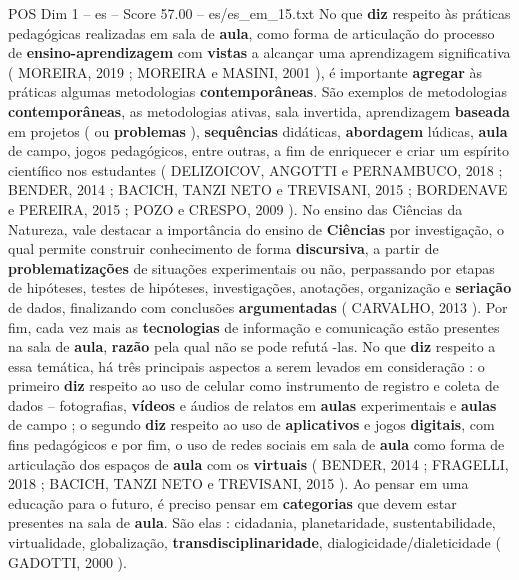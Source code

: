 \begin{textsample}{POS Dim 1 – es – Score 57.00 – es/es\_em\_15.txt}
No que \textbf{diz} respeito às práticas pedagógicas realizadas em sala de \textbf{aula}, como forma de articulação do processo de \textbf{ensino-aprendizagem} com \textbf{vistas} a alcançar uma aprendizagem significativa ( MOREIRA, 2019 ; MOREIRA e MASINI, 2001 ), é importante \textbf{agregar} às práticas algumas metodologias \textbf{contemporâneas}.
São exemplos de metodologias \textbf{contemporâneas}, as metodologias ativas, sala invertida, aprendizagem \textbf{baseada} em projetos ( ou \textbf{problemas} ), \textbf{sequências} didáticas, \textbf{abordagem} lúdicas, \textbf{aula} de campo, jogos pedagógicos, entre outras, a fim de enriquecer e criar um espírito científico nos estudantes ( DELIZOICOV, ANGOTTI e PERNAMBUCO, 2018 ; BENDER, 2014 ; BACICH, TANZI NETO e TREVISANI, 2015 ; BORDENAVE e PEREIRA, 2015 ; POZO e CRESPO, 2009 ).
No ensino das Ciências da Natureza, vale destacar a importância do ensino de \textbf{Ciências} por investigação, o qual permite construir conhecimento de forma \textbf{discursiva}, a partir de \textbf{problematizações} de situações experimentais ou não, perpassando por etapas de hipóteses, testes de hipóteses, investigações, anotações, organização e \textbf{seriação} de dados, finalizando com conclusões \textbf{argumentadas} ( CARVALHO, 2013 ).
Por fim, cada vez mais as \textbf{tecnologias} de informação e comunicação estão presentes na sala de \textbf{aula}, \textbf{razão} pela qual não se pode refutá -las.
No que \textbf{diz} respeito a essa temática, há três principais aspectos a serem levados em consideração : o primeiro \textbf{diz} respeito ao uso de celular como instrumento de registro e coleta de dados – fotografias, \textbf{vídeos} e áudios de relatos em \textbf{aulas} experimentais e \textbf{aulas} de campo ; o segundo \textbf{diz} respeito ao uso de \textbf{aplicativos} e jogos \textbf{digitais}, com fins pedagógicos e por fim, o uso de redes sociais em sala de \textbf{aula} como forma de articulação dos espaços de \textbf{aula} com os \textbf{virtuais} ( BENDER, 2014 ; FRAGELLI, 2018 ; BACICH, TANZI NETO e TREVISANI, 2015 ).
Ao pensar em uma educação para o futuro, é preciso pensar em \textbf{categorias} que devem estar presentes na sala de \textbf{aula}.
São elas : cidadania, planetaridade, sustentabilidade, virtualidade, globalização, \textbf{transdisciplinaridade}, dialogicidade/dialeticidade ( GADOTTI, 2000 ).

\end{textsample}

